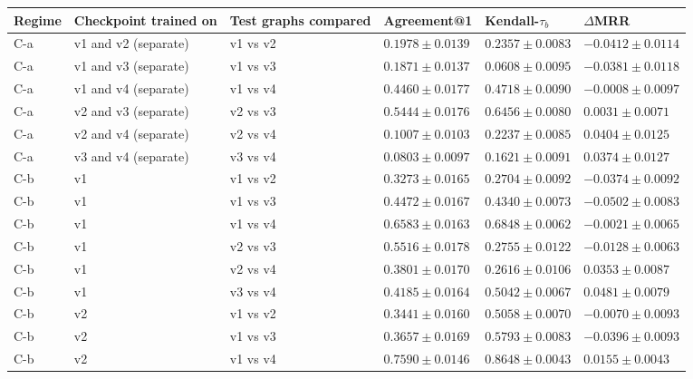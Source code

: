 \begin{table}[htbp]
\centering
\small
\renewcommand{\arraystretch}{1.15}
\setlength{\tabcolsep}{5pt}
\begin{adjustbox}{max width=\linewidth}
\begin{tabular}{|l|l|l|l|l|l|}
\hline
\textbf{Regime} & \textbf{Checkpoint trained on} & \textbf{Test graphs compared} & \textbf{Agreement@1} & \textbf{Kendall-$\tau_b$} & \textbf{$\Delta$MRR} \\
\hline
C-a & v1 and v2 (separate) & v1 vs v2 & $0.1978 \pm 0.0139$ & $0.2357 \pm 0.0083$ & $-0.0412 \pm 0.0114$ \\
\hline
C-a & v1 and v3 (separate) & v1 vs v3 & $0.1871 \pm 0.0137$ & $0.0608 \pm 0.0095$ & $-0.0381 \pm 0.0118$ \\
\hline
C-a & v1 and v4 (separate) & v1 vs v4 & $0.4460 \pm 0.0177$ & $0.4718 \pm 0.0090$ & $-0.0008 \pm 0.0097$ \\
\hline
C-a & v2 and v3 (separate) & v2 vs v3 & $0.5444 \pm 0.0176$ & $0.6456 \pm 0.0080$ & $0.0031 \pm 0.0071$ \\
\hline
C-a & v2 and v4 (separate) & v2 vs v4 & $0.1007 \pm 0.0103$ & $0.2237 \pm 0.0085$ & $0.0404 \pm 0.0125$ \\
\hline
C-a & v3 and v4 (separate) & v3 vs v4 & $0.0803 \pm 0.0097$ & $0.1621 \pm 0.0091$ & $0.0374 \pm 0.0127$ \\
\hline
C-b & v1 & v1 vs v2 & $0.3273 \pm 0.0165$ & $0.2704 \pm 0.0092$ & $-0.0374 \pm 0.0092$ \\
\hline
C-b & v1 & v1 vs v3 & $0.4472 \pm 0.0167$ & $0.4340 \pm 0.0073$ & $-0.0502 \pm 0.0083$ \\
\hline
C-b & v1 & v1 vs v4 & $0.6583 \pm 0.0163$ & $0.6848 \pm 0.0062$ & $-0.0021 \pm 0.0065$ \\
\hline
C-b & v1 & v2 vs v3 & $0.5516 \pm 0.0178$ & $0.2755 \pm 0.0122$ & $-0.0128 \pm 0.0063$ \\
\hline
C-b & v1 & v2 vs v4 & $0.3801 \pm 0.0170$ & $0.2616 \pm 0.0106$ & $0.0353 \pm 0.0087$ \\
\hline
C-b & v1 & v3 vs v4 & $0.4185 \pm 0.0164$ & $0.5042 \pm 0.0067$ & $0.0481 \pm 0.0079$ \\
\hline
C-b & v2 & v1 vs v2 & $0.3441 \pm 0.0160$ & $0.5058 \pm 0.0070$ & $-0.0070 \pm 0.0093$ \\
\hline
C-b & v2 & v1 vs v3 & $0.3657 \pm 0.0169$ & $0.5793 \pm 0.0083$ & $-0.0396 \pm 0.0093$ \\
\hline
C-b & v2 & v1 vs v4 & $0.7590 \pm 0.0146$ & $0.8648 \pm 0.0043$ & $0.0155 \pm 0.0043$ \\

\end{tabular}
\end{adjustbox}
\end{table}

